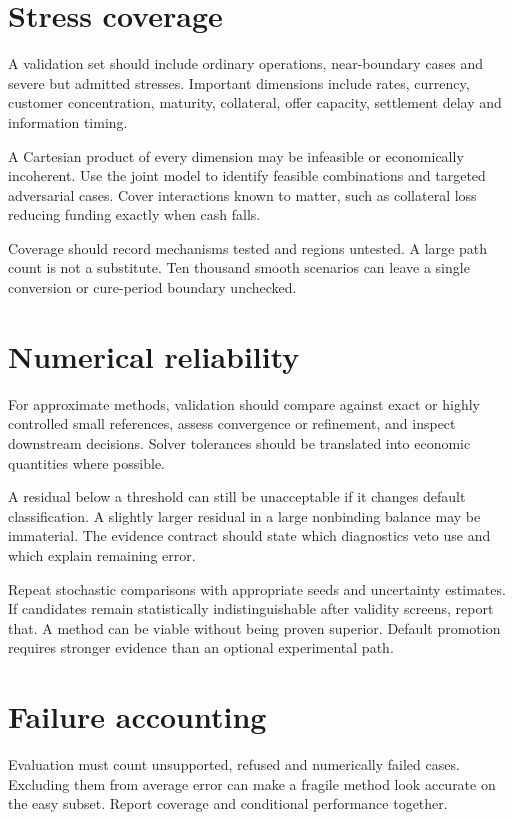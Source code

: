 \section{Stress coverage}
A validation set should include ordinary operations, near-boundary cases and severe but admitted stresses. Important dimensions include rates, currency, customer concentration, maturity, collateral, offer capacity, settlement delay and information timing.

A Cartesian product of every dimension may be infeasible or economically incoherent. Use the joint model to identify feasible combinations and targeted adversarial cases. Cover interactions known to matter, such as collateral loss reducing funding exactly when cash falls.

Coverage should record mechanisms tested and regions untested. A large path count is not a substitute. Ten thousand smooth scenarios can leave a single conversion or cure-period boundary unchecked.

\section{Numerical reliability}
For approximate methods, validation should compare against exact or highly controlled small references, assess convergence or refinement, and inspect downstream decisions. Solver tolerances should be translated into economic quantities where possible.

A residual below a threshold can still be unacceptable if it changes default classification. A slightly larger residual in a large nonbinding balance may be immaterial. The evidence contract should state which diagnostics veto use and which explain remaining error.

Repeat stochastic comparisons with appropriate seeds and uncertainty estimates. If candidates remain statistically indistinguishable after validity screens, report that. A method can be viable without being proven superior. Default promotion requires stronger evidence than an optional experimental path.

\section{Failure accounting}
Evaluation must count unsupported, refused and numerically failed cases. Excluding them from average error can make a fragile method look accurate on the easy subset. Report coverage and conditional performance together.

